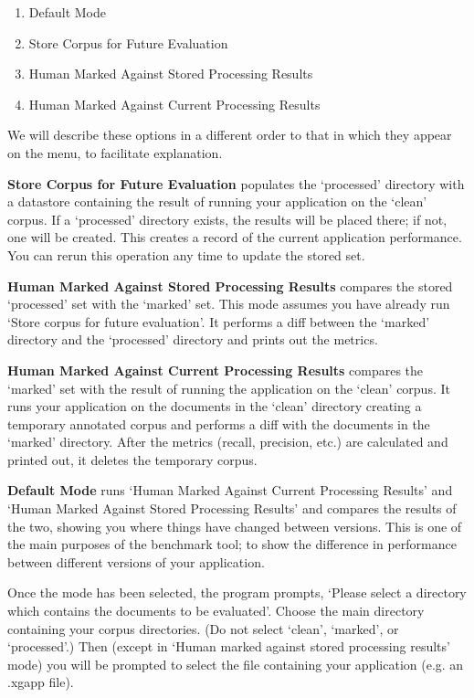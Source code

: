 \begin{enumerate}
  \item Default Mode
  \item Store Corpus for Future Evaluation
  \item Human Marked Against Stored Processing Results
  \item Human Marked Against Current Processing Results
\end{enumerate}

We will describe these options in a different order to that in which they
appear on the menu, to facilitate explanation.

{\bf Store Corpus for Future Evaluation} populates the `processed' directory with
a datastore containing the result of running your application on the `clean'
corpus. If a `processed' directory exists, the results will be placed there; if
not, one will be created. This creates a record of the current application
performance. You can rerun this operation any time to update the stored set.

{\bf Human Marked Against Stored Processing Results} compares the stored
`processed' set with the `marked' set. This mode assumes you have already run
`Store corpus for future evaluation'. It performs a diff between the `marked'
directory and the `processed' directory and prints out the metrics.

{\bf Human Marked Against Current Processing Results} compares the `marked' set
with the result of running the application on the `clean' corpus. It runs your
application on the documents in the `clean' directory creating a temporary
annotated corpus and performs a diff with the documents in the `marked'
directory. After the metrics (recall, precision, etc.) are calculated and printed
out, it deletes the temporary corpus.

{\bf Default Mode} runs `Human Marked Against Current Processing Results' and
`Human Marked Against Stored Processing Results' and compares the results of the
two, showing you where things have changed between versions. This is one of the
main purposes of the benchmark tool; to show the difference in performance
between different versions of your application.

Once the mode has been selected, the program prompts, `Please select a directory
which contains the documents to be evaluated'. Choose the main directory
containing your corpus directories. (Do not select `clean', `marked', or
`processed'.) Then (except in `Human marked against stored processing
results' mode) you will be prompted to select the file containing your
application (e.g. an .xgapp file).

